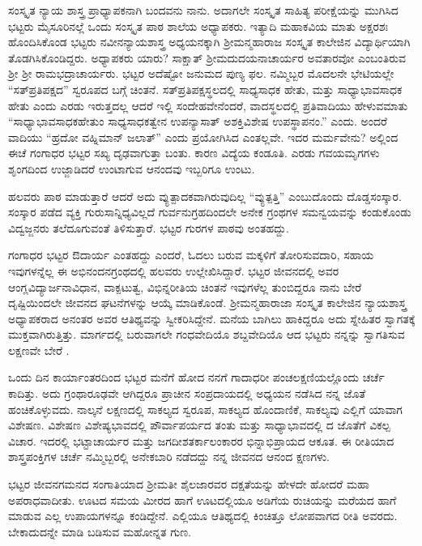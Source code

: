 {ಸಂಸ್ಕೃತ ನ್ಯಾಯ ಶಾಸ್ತ್ರ ಪ್ರಾಧ್ಯಾಪಕನಾಗಿ ಬಂದವನು ನಾನು. ಅದಾಗಲೇ ಸಂಸ್ಕೃತ ಸಾಹಿತ್ಯ ಪರೀಕ್ಷೆಯನ್ನು ಮುಗಿಸಿದ ಭಟ್ಟರು ಮೈಸೂರಿನಲ್ಲೆ ಒಂದು ಸಂಸ್ಕೃತ ಪಾಠ ಶಾಲೆಯ ಅಧ್ಯಾಪಕರು.  ಇತ್ಯಾದಿ ಮಹಾಕವಿಯ ಮಾತು ಅಕ್ಷರಶಃ ಹೊಂದಿಸಿಕೊಂಡ ಭಟ್ಟರು ನವೀನನ್ಯಾಯಶಾಸ್ತ್ರ ಅಧ್ಯಯನಕ್ಕಾಗಿ ಶ್ರೀಮನ್ಮಹಾರಾಜ ಸಂಸ್ಕೃತ ಕಾಲೇಜಿನ ವಿದ್ಯಾರ್ಥಿಯಾಗಿ ತೊಡಗಿಸಿಕೊಂಡಿದ್ದರು. ಅಧ್ಯಾಪಕರು ಯಾರು? ಸಾಕ್ಷಾತ್ ಶ್ರೀಮದುದಯನಾಚಾರ್ಯರ ಅವತಾರವೋ ಎಂಬಂತಿರುವ ಶ್ರೀ ಶ್ರೀ ರಾಮಭದ್ರಾಚಾರ್ಯರು. ಭಟ್ಟರ ಅದೆಷ್ಟೋ ಜನುಮದ ಪುಣ್ಯ ಫಲ. ನಮ್ಮಿಬ್ಬರ ಮೊದಲನೇ ಭೇಟಿಯಲ್ಲೇ “ಸತ್‍ಪ್ರತಿಪಕ್ಷದ” ಸ್ವರೂಪದ ಬಗ್ಗೆ ಚಿಂತನೆ. ಸತ್‍ಪ್ರತಿಪಕ್ಷಸ್ಥಲದಲ್ಲಿ ಸಾಧ್ಯಸಾಧಕ ಹೇತು, ಮತ್ತು ಸಾಧ್ಯಾಭಾವಸಾಧಕ ಹೇತು ಎಂದು ಎರಡು ಇರುತ್ತದಲ್ಲ ಆದರೆ ಇಲ್ಲಿ ಸಂದೇಹವೇನೆಂದರೆ, ವಾದಸ್ಥಲದಲ್ಲಿ ಪ್ರತಿವಾದಿಯು ಹೇಳುವಮಾತು “ಸಾಧ್ಯಾಭಾವಸಾಧಕಹೇತುಂ ಸಾಧ್ಯಸಾಧಕತ್ವೇನ ಉಪನ್ಯಾಸಾತ್ ಅಶಕ್ತಿವಿಶೇಷ ಉಪಸ್ಥಾಪನಂ.” ಎಂದು. ಅಂದರೆ ವಾದಿಯು “ಹ್ರದೋ ವಹ್ನಿಮಾನ್ ಜಲಾತ್” ಎಂದು ಪ್ರಯೋಗಿಸಿದ ಎಂತಲ್ಲವೇ. ಇದರ ಮರ್ಮವೇನು? ಅಲ್ಲಿಂದ ಈಚೆ ಗಂಗಾಧರ ಭಟ್ಟರ ಸಖ್ಯ ದೃಢವಾಗುತ್ತಾ ಬಂತು. ಕಾರಣ ವಿದ್ಯೆಯ ಕಂಡೂತಿ. ಎರಡು ಗವಯಮೃಗಗಳು ಶೃಂಗದಿಂದ  ಉಜ್ಜಾಡಿದರೆ ಉಂಟಾಗುವ ಆನಂದವು ಇಬ್ಬರಿಗೂ ಉಂಟು.

ಹಲವರು ಪಾಠ ಮಾಡುತ್ತಾರೆ ಆದರೆ ಅದು ವ್ಯುತ್ಪಾದಕವಾಗಿರುವುದಿಲ್ಲ “ವ್ಯುತ್ಪತ್ತಿ” ಎಂಬುದೊಂದು ದೊಡ್ಡಸಂಸ್ಕಾರ. ಸಂಸ್ಕಾರ ಪಡೆದ ವ್ಯಕ್ತಿ ಗುರುಸಾನ್ನಿಧ್ಯವಿಲ್ಲದೆ ಗುರ್ವನುಗ್ರಹದಿಂದಲೇ ಅನೇಕ ಗ್ರಂಥಗಳ ಸಮನ್ವಯವನ್ನು ಕಂಡುಕೊಂಡು ವಿದ್ವಜ್ಜನರು ತಲೆದೂಗುವಂತೆ ತಿಳಿಸುತ್ತಾರೆ. ಭಟ್ಟರ ಗುರಗಳ ಪಾಠವು ಅಂತಹದ್ದು.

ಗಂಗಾಧರ ಭಟ್ಟರ  ಔದಾರ್ಯ ಎಂತಹದ್ದು ಎಂದರೆ, ಓದಲು ಬರುವ ಮಕ್ಕಳಿಗೆ ತೋರಿಸುವದಾರಿ, ಸಹಾಯ ಇವುಗಳನ್ನೆಲ್ಲ ಈ ಅಭಿನಂದನಗ್ರಂಥದಲ್ಲಿ ಹಲವರು ಉಲ್ಲೇಖಿಸಿದ್ದಾರೆ. ಭಟ್ಟರ ಜೀವನದಲ್ಲಿ ಅವರ ಆಂಗ್ಲವಿದ್ಯಾರ್ಜನಾವಿಧಾನ, ವಾಕ್ಪಟುತ್ವ, ವಿಭಿನ್ನರೀತಿಯ ಚಿಂತನೆ ಇವುಗಳೆಲ್ಲ ತುಂಬಿದ್ದರೂ ನಾನು ಬೇರೆ ದೃಷ್ಟಿಯಿಂದಲೇ ಜೀವನದ ಘಟನೆಗಳನ್ನು ಆಯ್ಕೆ ಮಾಡಿಕೊಂಡೆ. ಶ್ರೀಮನ್ಮಹಾರಾಜಾ ಸಂಸ್ಕೃತ ಕಾಲೇಜಿನ ನ್ಯಾಯಶಾಸ್ತ್ರ ಅಧ್ಯಾಪಕರಾದ ಅನಂತರ ಅವರ ಆತಿಥ್ಯವನ್ನು ಸ್ವೀಕರಿಸಿದ್ದೇನೆ. ಮನೆಯ ಬಾಗಿಲು ಹಾಕಿದ್ದರೂ ಅದು ಸ್ನೇಹಿತರ ಸ್ವಾಗತಕ್ಕೆ ಮುಕ್ತವಾಗಿರುತ್ತಿತ್ತು. ಮಾರ್ಗದಲ್ಲಿ ಬರುವಾಗಲೇ ಗಂಧವೇದಿಯೊ ಶಬ್ದವೇದಿಯೊ ಆದ ಭಟ್ಟರು ನನ್ನನ್ನು ಸ್ವಾಗತಿಸುವ ಲಕ್ಷಣವೇ ಬೇರೆ .

ಒಂದು ದಿನ ಕಾರ್ಯಾಂತರದಿಂದ ಭಟ್ಟರ ಮನೆಗೆ ಹೋದ ನನಗೆ ಗಾದಾಧರೀ ಪಂಚಲಕ್ಷಣಿಯಲ್ಲೊಂದು ಚರ್ಚೆ ಕಾದಿತ್ತು. ಅದು ಗ್ರಂಥಾರೂಢವೇ ಆಗಿದ್ದರೂ ಪ್ರಾಚೀನ ಸಂಪ್ರದಾಯದಲ್ಲಿ ಅಧ್ಯಯನ ನಡೆಸಿದ ನನ್ನ ಜೊತೆ ಹಂಚಿಕೊಳ್ಳುವದು. ನಾಲ್ಕನೆ ಲಕ್ಷಣದಲ್ಲಿ ಸಾಕಲ್ಯದ ಸ್ವರೂಪ, ಸಾಕಲ್ಯದ ಹೊಂದಾಣಿಕೆ, ಸಾಕಲ್ಯವು ಎಲ್ಲಿಗೆ ಯಾವಾಗ ವಿಶೇಷಣ. ವಿಶೇಷಣ ವಿಶೇಷ್ಯಭಾವದಲ್ಲಿ ಪೌರ್ವಾಪರ್ಯದ ತಂತು ಮತ್ತು ಸಾಧ್ಯಾಭಾವದಲ್ಲಿ  ದ ಜೊತೆಗೆ ವಿಕಲ್ಪ ವಿಚಾರ. ಇದರಲ್ಲಿ ಭಟ್ಟಾಚಾರ್ಯರ ಮತ್ತು ಜಗದೀಶತರ್ಕಾಲಂಕಾರರ ಭಿನ್ನಾಭಿಪ್ರಾಯದ ಆಕೂತ. ಈ ರೀತಿಯಾದ ಶಾಸ್ತ್ರಪಂಕ್ತಿಗಳ ಚರ್ಚೆ ನಮ್ಮಿಬ್ಬರಲ್ಲಿ ಅನೇಕಬಾರಿ ನಡೆದದ್ದು ನನ್ನ ಜೀವನದ ಆನಂದ ಕ್ಷಣಗಳು.

ಭಟ್ಟರ ಜೀವನಗಮನದ ಸಂಗಾತಿಯಾದ ಶ್ರೀಮತೀ ಶೈಲಜಾರವರ ದಕ್ಷತೆಯನ್ನು ಹೇಳದೇ ಹೋದರೆ ಮಹಾ ಅಪರಾಧವಾದೀತು. ಊಟದ ಸಮಯ ಮೀರದ ಹಾಗೆ ಊಟದಲ್ಲಿಯೂ ಅಡಿಗೆಯ ರುಚಿಯನ್ನು ಮರೆಯದ ಹಾಗೆ ಮಾಡುವ ಎಲ್ಲ ಉಪಾಯಗಳನ್ನೂ ಕಂಡಿದ್ದೇನೆ. ಎಲ್ಲಿಯೂ ಆತಿಥ್ಯದಲ್ಲಿ ಕಿಂಚಿತ್ತೂ ಲೋಪವಾಗದ ರೀತಿ ಅವರದು. ಬೇಕಾದುದನ್ನೇ ಮಾಡಿ ಬಡಿಸುವ ಮಹೋನ್ನತ ಗುಣ.

}
